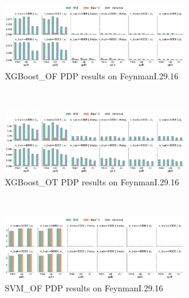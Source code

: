 \documentclass[runningheads]{llncs}
\begin{document}
\begin{figure}[ht]
    \centering
    \ContinuedFloat\
    \begin{subfigure}[b]{\textwidth}
        \centering
        \includegraphics[width=0.86\textwidth]{img/FeynmanI.29.16-all/feature_effect_errors_pdp_XGBoost_OF.png}
        \caption{XGBoost\_OF PDP results on FeynmanI.29.16}
    \end{subfigure}
    \\[10pt]
    \vfill
    \begin{subfigure}[b]{\textwidth}
        \centering
        \includegraphics[width=0.86\textwidth]{img/FeynmanI.29.16-all/feature_effect_errors_pdp_XGBoost_OT.png}
        \caption{XGBoost\_OT PDP results on FeynmanI.29.16}
    \end{subfigure}
    \\[10pt]
    \vfill
    \begin{subfigure}[b]{\textwidth}
        \centering
        \includegraphics[width=0.86\textwidth]{img/FeynmanI.29.16-all/feature_effect_errors_pdp_SVM_OF.png}
        \caption{SVM\_OF PDP results on FeynmanI.29.16}
    \end{subfigure}
    \\[10pt]
    \vfill
    \begin{subfigure}[b]{\textwidth}

\end{subfigure}
\end{figure}
\end{document}
